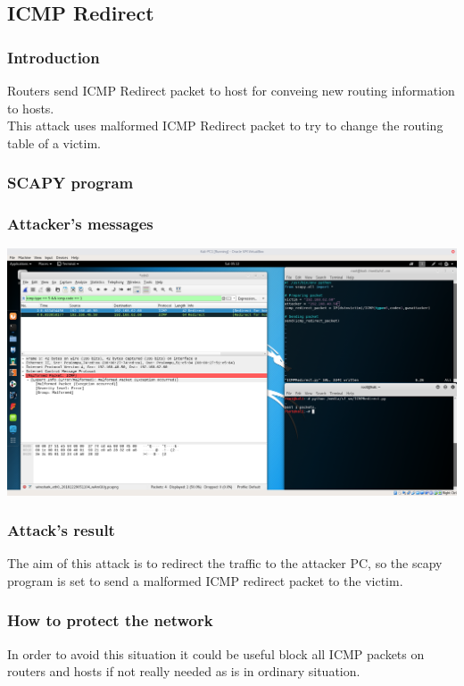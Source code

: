 \subsection{ICMP Redirect}
\subsubsection{Introduction}
Routers send ICMP Redirect packet to host for conveing new routing information to hosts.\\
This attack uses malformed ICMP Redirect packet to try to change the routing table of a victim.\par

\subsubsection{SCAPY program}


\subsubsection{Attacker's messages}
\includegraphics[width=16cm]{img/ICMPRedirect.png}

\subsubsection{Attack's result}
The aim of this attack is to redirect the traffic to the attacker PC, so the scapy program is set to send a malformed ICMP redirect packet to the victim.

\subsubsection{How to protect the network}
In order to avoid this situation it could be useful block all ICMP packets on routers and hosts if not really needed as is in ordinary situation.
